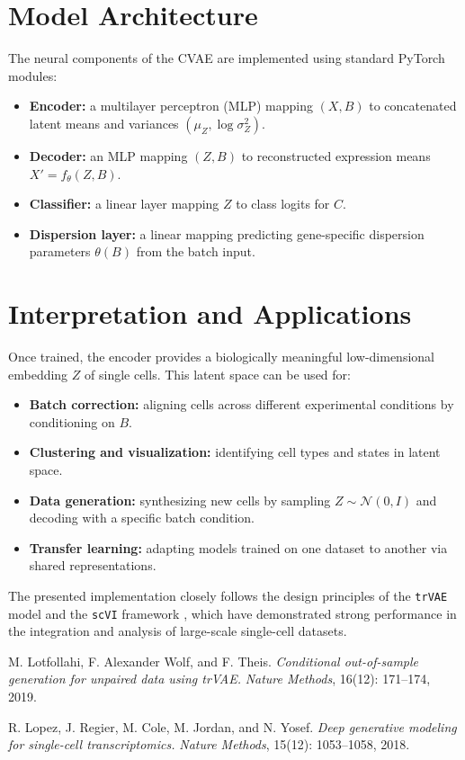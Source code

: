 \documentclass[11pt,a4paper]{article}
\begin{document}
\section{Model Architecture}

The neural components of the CVAE are implemented using standard PyTorch modules:
\begin{itemize}
  \item \textbf{Encoder:} a multilayer perceptron (MLP) mapping $(X, B)$ to concatenated latent means and variances $(\mu_Z, \log \sigma_Z^2)$.
  \item \textbf{Decoder:} an MLP mapping $(Z, B)$ to reconstructed expression means $X' = f_\theta(Z, B)$.
  \item \textbf{Classifier:} a linear layer mapping $Z$ to class logits for $C$.
  \item \textbf{Dispersion layer:} a linear mapping predicting gene-specific dispersion parameters $\theta(B)$ from the batch input.
\end{itemize}

\section{Interpretation and Applications}

Once trained, the encoder provides a biologically meaningful low-dimensional embedding $Z$ of single cells. This latent space can be used for:
\begin{itemize}
  \item \textbf{Batch correction:} aligning cells across different experimental conditions by conditioning on $B$.
  \item \textbf{Clustering and visualization:} identifying cell types and states in latent space.
  \item \textbf{Data generation:} synthesizing new cells by sampling $Z \sim \mathcal{N}(0,I)$ and decoding with a specific batch condition.
  \item \textbf{Transfer learning:} adapting models trained on one dataset to another via shared representations.
\end{itemize}

The presented implementation closely follows the design principles of the \texttt{trVAE} model \cite{lotfollahi2019conditional} and the \texttt{scVI} framework \cite{lopez2018deep}, which have demonstrated strong performance in the integration and analysis of large-scale single-cell datasets.

\vspace{-0.5em}
\begin{thebibliography}{9}

M. Lotfollahi, F. Alexander Wolf, and F. Theis.
\newblock \emph{Conditional out-of-sample generation for unpaired data using trVAE.}
\newblock \textit{Nature Methods}, 16(12): 171–174, 2019.

R. Lopez, J. Regier, M. Cole, M. Jordan, and N. Yosef.
\newblock \emph{Deep generative modeling for single-cell transcriptomics.}
\newblock \textit{Nature Methods}, 15(12): 1053–1058, 2018.

\end{thebibliography}
\end{document}
